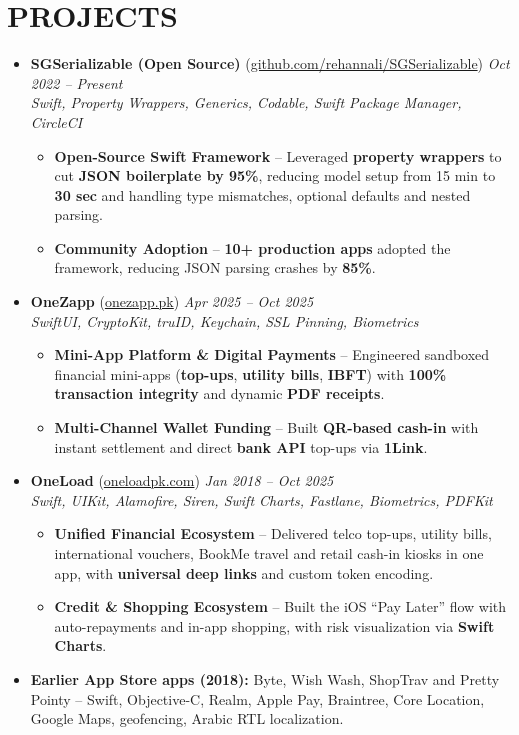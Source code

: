\documentclass[a4paper,10pt]{article}
\newcommand{\projectItem}[2]{%
  \item \textbf{#1} -- #2 \vspace{-2pt}%
}
\newcommand{\resumeProjectHeadingLink}[4]{%
  \vspace{3pt}\item
    \textbf{#1} (\href{https://#2}{#2}) \hfill \textit{\small #4}\\
    \textit{\small #3}\vspace{-4pt}%
}
\newcommand{\resumeSubHeadingListStart}{\begin{itemize}[leftmargin=0.0in, label={}]}
\newcommand{\resumeSubHeadingListEnd}{\end{itemize}}
\newcommand{\resumeItemListStart}{\begin{itemize}}
\newcommand{\resumeItemListEnd}{\end{itemize}\vspace{-5pt}}
\begin{document}
\section{PROJECTS}
    \resumeSubHeadingListStart
        \resumeProjectHeadingLink
        {SGSerializable (Open Source)}{github.com/rehannali/SGSerializable}{Swift, Property Wrappers, Generics, Codable, Swift Package Manager, CircleCI}{Oct 2022 -- Present}
        \resumeItemListStart
            \projectItem{Open-Source Swift Framework}{Leveraged \textbf{property wrappers} to cut \textbf{JSON boilerplate by 95\%}, reducing model setup from 15 min to \textbf{30 sec} and handling type mismatches, optional defaults and nested parsing.}
            \projectItem{Community Adoption}{\textbf{10+ production apps} adopted the framework, reducing JSON parsing crashes by \textbf{85\%}.}
        \resumeItemListEnd
        \resumeProjectHeadingLink
        {OneZapp}{onezapp.pk}{SwiftUI, CryptoKit, truID, Keychain, SSL Pinning, Biometrics}{Apr 2025 -- Oct 2025}
        \resumeItemListStart
            \projectItem{Mini-App Platform \& Digital Payments}{Engineered sandboxed financial mini-apps (\textbf{top-ups}, \textbf{utility bills}, \textbf{IBFT}) with \textbf{100\% transaction integrity} and dynamic \textbf{PDF receipts}.}
            \projectItem{Multi-Channel Wallet Funding}{Built \textbf{QR-based cash-in} with instant settlement and direct \textbf{bank API} top-ups via \textbf{1Link}.}
        \resumeItemListEnd
        \resumeProjectHeadingLink
        {OneLoad}{oneloadpk.com}{Swift, UIKit, Alamofire, Siren, Swift Charts, Fastlane, Biometrics, PDFKit}{Jan 2018 -- Oct 2025}
        \resumeItemListStart
            \projectItem{Unified Financial Ecosystem}{Delivered telco top-ups, utility bills, international vouchers, BookMe travel and retail cash-in kiosks in one app, with \textbf{universal deep links} and custom token encoding.}
            \projectItem{Credit \& Shopping Ecosystem}{Built the iOS ``Pay Later'' flow with auto-repayments and in-app shopping, with risk visualization via \textbf{Swift Charts}.}
        \resumeItemListEnd
        \item \small\textbf{Earlier App Store apps (2018):} Byte, Wish Wash, ShopTrav and Pretty Pointy -- Swift, Objective-C, Realm, Apple Pay, Braintree, Core Location, Google Maps, geofencing, Arabic RTL localization. %
    \resumeSubHeadingListEnd
\vspace{-2pt}
\fi
\end{document}
